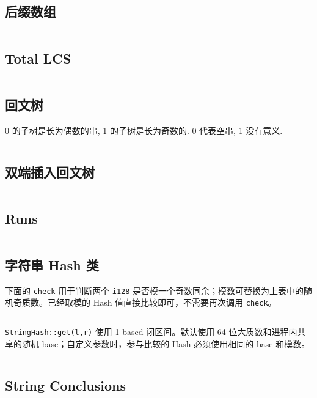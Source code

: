				\subsection{后缀数组}
					\inputminted{cpp}{sections/String/assets/String/SA.cpp}
				\subsection{Total LCS}
				\inputminted{cpp}{sections/String/assets/String/Total LCS.cpp}
				\subsection{回文树}
					0 的子树是长为偶数的串, 1 的子树是长为奇数的. 0 代表空串, 1 没有意义.
					\inputminted{cpp}{sections/String/assets/String/PAM.cpp}
				\subsection{双端插入回文树}
					\inputminted{cpp}{sections/String/assets/String/PAM_bidirectional.cpp}
				\subsection{Runs}
					\inputminted{cpp}{sections/String/assets/String/Runs.cpp}
				\subsection{字符串 Hash 类}
				\texttt{}
				下面的 \texttt{check} 用于判断两个 \texttt{i128} 是否模一个奇数同余；模数可替换为上表中的随机奇质数。已经取模的 Hash 值直接比较即可，不需要再次调用 \texttt{check}。
				\inputminted{cpp}{sections/String/assets/String/hash_check.cpp}
				\texttt{StringHash::get(l,r)} 使用 1-based 闭区间。默认使用 64 位大质数和进程内共享的随机 base；自定义参数时，参与比较的 Hash 必须使用相同的 base 和模数。
				\inputminted{cpp}{sections/String/assets/String/hash.cpp}
				\subsection{String Conclusions}
					
			\newpage
